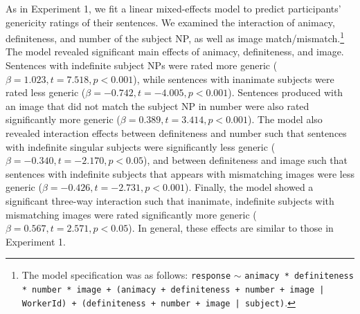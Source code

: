\documentclass[10pt,letterpaper]{article}
\begin{document}
As in Experiment 1, we fit a linear mixed-effects model to predict participants' genericity ratings of their sentences. We examined the interaction of animacy, definiteness, and number of the subject NP, as well as image match/mismatch.\footnote{The model specification was as follows: \texttt{response} \(\sim\) \texttt{animacy * definiteness * number * image + (animacy + definiteness + number + image | WorkerId) + (definiteness + number + image | subject)}.} The model revealed significant main effects of animacy, definiteness, and image. Sentences with indefinite subject NPs were rated more generic (\(\beta = 1.023, t = 7.518, p < 0.001\)), while sentences with inanimate subjects were rated less generic (\(\beta = -0.742, t = -4.005, p < 0.001\)). Sentences produced with an image that did not match the subject NP in number were also rated significantly more generic (\(\beta = 0.389, t = 3.414, p < 0.001\)). The model also revealed interaction effects between definiteness and number such that sentences with indefinite singular subjects were significantly less generic (\(\beta = -0.340, t= -2.170, p < 0.05\)), and between definiteness and image such that sentences with indefinite subjects that appears with mismatching images were less generic (\(\beta = -0.426, t = -2.731, p < 0.001\)). Finally, the model showed a significant three-way interaction such that inanimate, indefinite subjects with mismatching images were rated significantly more generic (\(\beta = 0.567, t = 2.571, p < 0.05\)). In general, these effects are similar to those in Experiment 1. 

\end{document}

